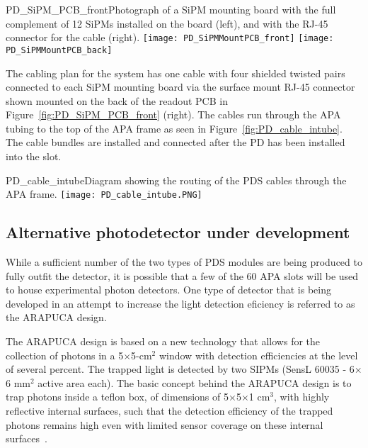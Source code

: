 \begin{cdrfigure}
  {PD_SiPM_PCB_front}{Photograph of a SiPM mounting board
    with the full complement of 12 SiPMs installed on the board (left), and with the 
    RJ-45 connector for the cable (right).}
\texttt{[image: PD\_SiPMMountPCB\_front]}
\texttt{[image: PD\_SiPMMountPCB\_back]}
\end{cdrfigure}


The cabling plan for the system has one cable with four shielded twisted pairs 
connected to each SiPM mounting board via the surface mount RJ-45 connector
shown mounted on the back of the readout PCB in 
Figure~\ref{fig:PD_SiPM_PCB_front} (right).  
The cables run through the APA tubing to the top of the APA frame as seen
in Figure~\ref{fig:PD_cable_intube}.
The cable bundles are installed and connected 
after the PD has been installed into the slot.
\begin{cdrfigure}
  {PD_cable_intube}{Diagram showing the routing of the PDS cables
    through the APA frame.}
\texttt{[image: PD\_cable\_intube.PNG]}
\end{cdrfigure}


\subsection{Alternative photodetector under development}

While a sufficient number of the two types of PDS modules are being produced to fully outfit the detector, it is possible that a few of the 60 APA slots will be used to house experimental photon detectors. One type of detector that is being developed in an attempt to increase the light detection eficiency is referred to as the ARAPUCA design.

The ARAPUCA design is based on a new technology that allows for the collection of photons in a 5$\times$5-cm$^2$ window  with detection efficiencies at the level of several percent. The trapped light is detected by two SIPMs (SensL 60035 - 6$\times$6 mm$^2$ active area each). The basic concept behind the ARAPUCA design is to trap photons inside a teflon box, of  dimensions of 5$\times$5$\times$1 cm$^3$, with highly reflective internal surfaces, such that the detection efficiency of the trapped photons remains high even with limited sensor coverage on these internal surfaces~\cite{Machado:2016jqe}.

